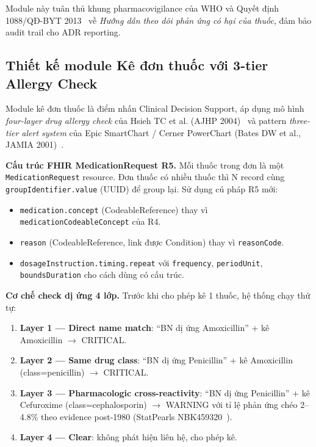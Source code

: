 \documentclass[a4paper,13pt,3p,twoside,openany]{report}
\theoremstyle{definition}
\theoremstyle{remark}
\theoremstyle{definition}
\let\ORIGsubsection\subsection
\renewcommand{\subsection}{\needspace{3\baselineskip}\ORIGsubsection}
\begin{document}
Module này tuân thủ khung pharmacovigilance của WHO và Quyết định 1088/QĐ-BYT 2013~\cite{qd1088} về \textit{Hướng dẫn theo dõi phản ứng có hại của thuốc}, đảm bảo audit trail cho ADR reporting.

\subsection{Thiết kế module Kê đơn thuốc với 3-tier Allergy Check}

Module kê đơn thuốc là điểm nhấn Clinical Decision Support, áp dụng mô hình \textit{four-layer drug allergy check} của Hsieh TC et al. (AJHP 2004)~\cite{hsieh2004} và pattern \textit{three-tier alert system} của Epic SmartChart / Cerner PowerChart (Bates DW et al., JAMIA 2001)~\cite{bates2001}.

\textbf{Cấu trúc FHIR MedicationRequest R5.} Mỗi thuốc trong đơn là một \texttt{MedicationRequest} resource. Đơn thuốc có nhiều thuốc thì N record cùng \texttt{groupIdentifier.value} (UUID) để group lại. Sử dụng cú pháp R5 mới:
\begin{itemize}
  \item \texttt{medication.concept} (CodeableReference) thay vì \texttt{medicationCodeableConcept} của R4.
  \item \texttt{reason} (CodeableReference, link được Condition) thay vì \texttt{reasonCode}.
  \item \texttt{dosageInstruction.timing.repeat} với \texttt{frequency}, \texttt{periodUnit}, \texttt{boundsDuration} cho cách dùng có cấu trúc.
\end{itemize}

\textbf{Cơ chế check dị ứng 4 lớp.} Trước khi cho phép kê 1 thuốc, hệ thống chạy thứ tự:
\begin{enumerate}
  \item \textbf{Layer 1 --- Direct name match}: ``BN dị ứng Amoxicillin'' + kê Amoxicillin $\to$ CRITICAL.
  \item \textbf{Layer 2 --- Same drug class}: ``BN dị ứng Penicillin'' + kê Amoxicillin (class=penicillin) $\to$ CRITICAL.
  \item \textbf{Layer 3 --- Pharmacologic cross-reactivity}: ``BN dị ứng Penicillin'' + kê Cefuroxime (class=cephalosporin) $\to$ WARNING với tỉ lệ phản ứng chéo 2--4.8\% theo evidence post-1980 (StatPearls NBK459320~\cite{statpearls}).
  \item \textbf{Layer 4 --- Clear}: không phát hiện liên hệ, cho phép kê.
\end{enumerate}
\end{document}
